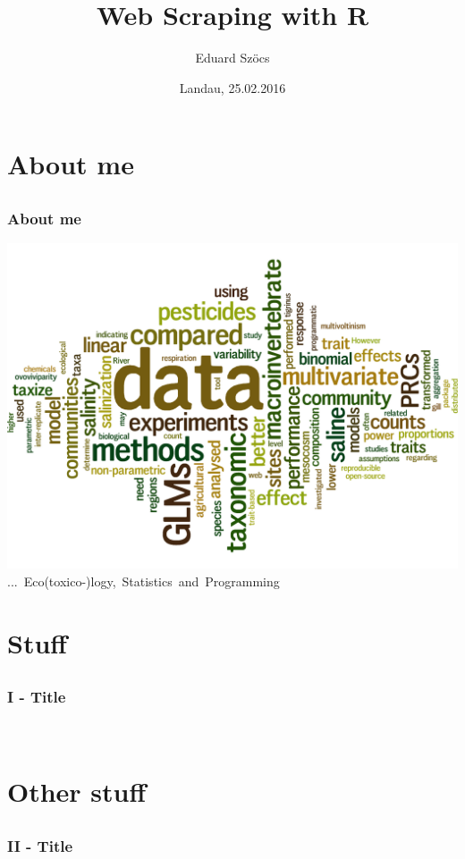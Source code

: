 \documentclass[12pt, t]{beamer}
\title{Web Scraping with R}
\author{Eduard Szöcs}
\institute{Institute for Environmental Sciences, University of Koblenz-Landau}
\date{Landau, 25.02.2016}
\begin{document}
\begin{frame}
\titlepage
\end{frame}


\section{About me} 
\subsection{}
\begin{frame}
\frametitle{About me}
\center
\includegraphics[width =.8\textwidth]{fig/wordcloud_abstracts_firstauthor.png} \\   
\mbox{... Eco(toxico-)logy, Statistics and Programming}
\end{frame}



\section{Stuff}
\subsection{}
\begin{frame}
\frametitle{I - Title}
\
\end{frame}


\section{Other stuff}
\subsection{}
\begin{frame}
\frametitle{II - Title}
\end{frame}
\end{document}
